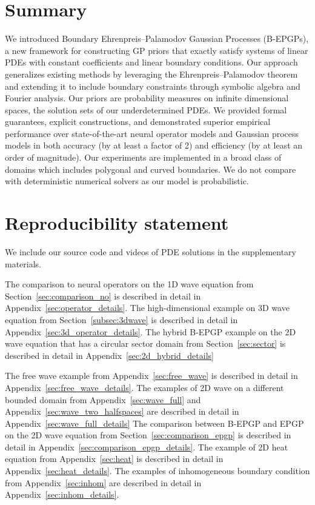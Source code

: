 \documentclass{article} %
\theoremstyle{plain}
\theoremstyle{definition}
\theoremstyle{remark}
\begin{document}
\section{Summary}

We introduced Boundary Ehrenpreis--Palamodov Gaussian Processes (B-EPGPs), a new framework for constructing GP priors that exactly satisfy systems of linear PDEs with constant coefficients and linear boundary conditions. Our approach generalizes existing methods by leveraging the Ehrenpreis--Palamodov theorem and extending it to include boundary constraints through symbolic algebra and Fourier analysis. Our priors are probability measures on infinite dimensional spaces, the solution sets of our underdetermined PDEs. We provided formal guarantees, explicit constructions, and demonstrated superior empirical performance over state-of-the-art neural operator models and Gaussian process models in both accuracy (by at least a factor of 2) and efficiency (by at least an order of magnitude).  Our experiments are implemented in a broad class of domains which includes polygonal and curved boundaries. We do not compare with deterministic numerical solvers as our model is probabilistic.




\newpage
\section{Reproducibility statement}

We include our source code and videos of PDE solutions in the supplementary materials.

The comparison to neural operators on the 1D wave equation from Section~\ref{sec:comparison_no} is described in detail in Appendix~\ref{sec:operator_details}.
The high-dimensional example on 3D wave equation from Section~\ref{subsec:3dwave} is described in detail in Appendix~\ref{sec:3d_operator_details}.
The hybrid B-EPGP example on the 2D wave equation that has a circular sector domain from Section~\ref{sec:sector} is described in detail in Appendix~\ref{sec:2d_hybrid_details}

The free wave example from Appendix~\ref{sec:free_wave} is described in detail in Appendix~\ref{sec:free_wave_details}.
The examples of 2D wave on a different bounded domain from Appendix~\ref{sec:wave_full} and Appendix~\ref{sec:wave_two_halfspaces} are described in detail in Appendix~\ref{sec:wave_full_details}
The comparison between B-EPGP and EPGP on the 2D wave equation from Section~\ref{sec:comparison_epgp} is described in detail in Appendix~\ref{sec:comparison_epgp_details}.
The example of 2D heat equation from Appendix~\ref{sec:heat} is described in detail in Appendix~\ref{sec:heat_details}.
The examples of inhomogeneous boundary condition from Appendix~\ref{sec:inhom} are described in detail in Appendix~\ref{sec:inhom_details}.
\end{document}
